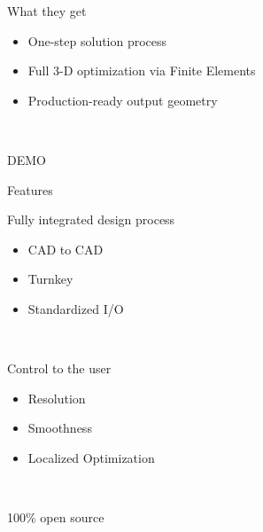 \begin{frame}{What they get}	
\begin{itemize}
			\item One-step solution process	
			\item Full 3-D optimization via Finite Elements
			\item Production-ready output geometry
			\end{itemize}~\\
\end{frame}	

\begin{frame}{DEMO}

\end{frame}

\begin{frame}{Features}

\begin{block}{Fully integrated design process}{
		\begin{itemize}		
			\item CAD to CAD
			\item Turnkey
			\item Standardized I/O			
		\end{itemize}~\\
		}
		\end{block}
\pause
\begin{block}{Control to the user}{
		\begin{itemize}		
			\item Resolution
			\item Smoothness
			\item Localized Optimization			
		\end{itemize}~\\
		}
		\end{block}
\pause		
\begin{block}{100\% open source}{
		}
		\end{block}

\end{frame}
		